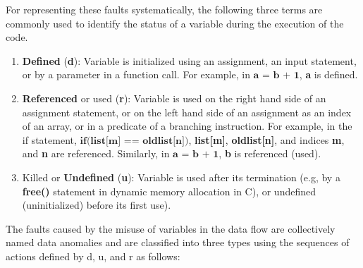 For representing these faults systematically, the following three terms are commonly used to identify the status of a variable during the execution of the code. 
\begin{enumerate}
    \item \textbf{Defined} (\textbf{d}): Variable is initialized using an assignment, an input statement, or by a parameter in a function call. For example, in $\textbf{a = b + 1}$, \textbf{a} is defined.
    \item \textbf{Referenced} or used (\textbf{r}): Variable is used on the right hand side of an assignment statement, or on the left hand side of an assignment as an index of an array, or in a predicate of a branching instruction. For example, in the if statement, $\textbf{if(list[m] == oldlist[n])}$, \textbf{list[m]}, \textbf{oldlist[n]}, and indices \textbf{m}, and \textbf{n} are referenced. Similarly, in $\textbf{a = b + 1}$, \textbf{b} is referenced (used).
    \item Killed or \textbf{Undefined} (\textbf{u}): Variable is used after its termination (e.g, by a \textbf{free()} statement in dynamic memory allocation in C), or undefined (uninitialized) before its first use). 
\end{enumerate}
The faults caused by the misuse of variables in the data flow are collectively named data anomalies and are classified into three types using the sequences of actions defined by d, u, and r  as follows:
